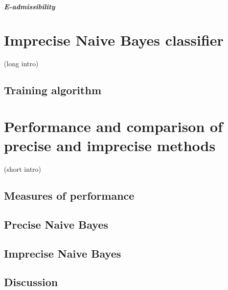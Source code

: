 \documentclass{report}
\theoremstyle{definition}
\begin{document}
\paragraph{E-admissibility} 

\chapter{Imprecise Naive Bayes classifier}
	(long intro)
	\section{Training algorithm}

\chapter{Performance and comparison of precise and imprecise methods}
	(short intro)
	\section{Measures of performance}
	\section{Precise Naive Bayes}
	\section{Imprecise Naive Bayes}
	\section{Discussion}  %
\end{document}
